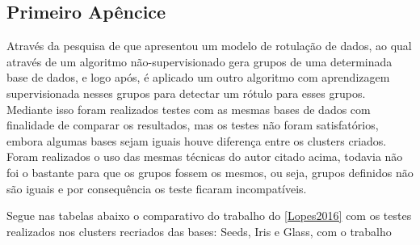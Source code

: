 
\begin{apendicesenv}

\partapendices

\chapter{Primeiro Apêncice}
\label{apendice:1}

Através da pesquisa de  que apresentou um modelo de rotulação de dados, ao qual através de um algoritmo não-supervisionado gera grupos de uma determinada base de dados, e logo após, é aplicado um outro algoritmo com aprendizagem supervisionada nesses grupos para detectar um rótulo para esses grupos. Mediante isso foram realizados testes com as mesmas bases de dados com finalidade de comparar os resultados, mas os testes não foram satisfatórios, embora algumas bases sejam iguais houve diferença entre os clusters criados. Foram realizados o uso das mesmas técnicas do autor citado acima, todavia não foi o bastante para que os grupos fossem os mesmos, ou seja, grupos definidos não são iguais e por consequência os teste ficaram incompatíveis.

Segue nas tabelas abaixo o comparativo do trabalho do \ref{Lopes2016} com os testes realizados nos clusters recriados das bases: Seeds, Iris e Glass, com o trabalho 


\end{apendicesenv}
